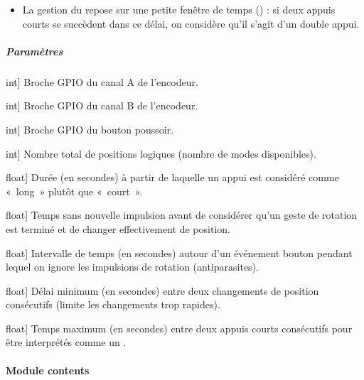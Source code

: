 \documentclass[letterpaper,10pt,french]{sphinxmanual}
\begin{document}
\begin{fulllineitems}
\begin{itemize}
\item {} 
\sphinxAtStartPar
La gestion du  repose sur une petite fenêtre de temps
() : si deux appuis courts se succèdent dans ce
délai, on considère qu’il s’agit d’un double appui.

\end{itemize}


\subparagraph{Paramètres}
\label{\detokenize{api/hardware.platform:parametres}}\begin{description}
\sphinxlineitem{pin\_a}{[}int{]}
\sphinxAtStartPar
Broche GPIO du canal A de l’encodeur.

\sphinxlineitem{pin\_b}{[}int{]}
\sphinxAtStartPar
Broche GPIO du canal B de l’encodeur.

\sphinxlineitem{pin\_sw}{[}int{]}
\sphinxAtStartPar
Broche GPIO du bouton poussoir.

\sphinxlineitem{positions\_count}{[}int{]}
\sphinxAtStartPar
Nombre total de positions logiques (nombre de modes disponibles).

\sphinxlineitem{long\_press\_threshold}{[}float{]}
\sphinxAtStartPar
Durée (en secondes) à partir de laquelle un appui est considéré comme
« long » plutôt que « court ».

\sphinxlineitem{gesture\_settle\_delay}{[}float{]}
\sphinxAtStartPar
Temps sans nouvelle impulsion avant de considérer qu’un geste de
rotation est terminé et de changer effectivement de position.

\sphinxlineitem{rotate\_button\_deadzone}{[}float{]}
\sphinxAtStartPar
Intervalle de temps (en secondes) autour d’un événement bouton
pendant lequel on ignore les impulsions de rotation (anti\sphinxhyphen{}parasites).

\sphinxlineitem{min\_step\_interval}{[}float{]}
\sphinxAtStartPar
Délai minimum (en secondes) entre deux changements de position
consécutifs (limite les changements trop rapides).

\sphinxlineitem{double\_click\_window}{[}float{]}
\sphinxAtStartPar
Temps maximum (en secondes) entre deux appuis courts consécutifs pour
être interprétés comme un .

\end{description}

\end{fulllineitems}



\paragraph{Module contents}
\label{\detokenize{api/hardware.platform:module-hardware.platform}}\label{\detokenize{api/hardware.platform:module-contents}}
\sphinxstepscope
\end{document}
